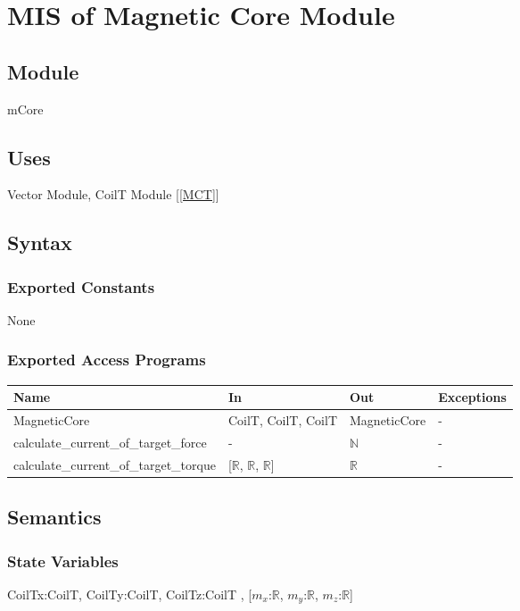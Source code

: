 \documentclass[12pt, titlepage]{article}
\begin{document}
\section{MIS of Magnetic Core Module} \label{MMC}

\subsection{Module}
mCore

\subsection{Uses}
Vector Module, CoilT Module [\ref{MCT}]

\subsection{Syntax}

\subsubsection{Exported Constants}
None
\subsubsection{Exported Access Programs}

\begin{center}
\begin{tabular}{p{6cm} p{4cm} p{3cm} p{2cm}}
\hline
\textbf{Name} & \textbf{In} & \textbf{Out} & \textbf{Exceptions} \\
\hline
MagneticCore  & CoilT, CoilT, CoilT & MagneticCore   & - \\
\hline
calculate\_current\_of\_target\_force & - & $\mathbb{N}$  & -  \\
\hline
calculate\_current\_of\_target\_torque & [$\mathbb{R}$, $\mathbb{R}$, $\mathbb{R}$] & $\mathbb{R}$  & -  \\
\hline
\end{tabular}
\end{center}

\subsection{Semantics}

\subsubsection{State Variables}
CoilTx:CoilT,  CoilTy:CoilT,  CoilTz:CoilT , [$m_x$:$\mathbb{R}$, $m_y$:$\mathbb{R}$, $m_z$:$\mathbb{R}$]
\end{document}
